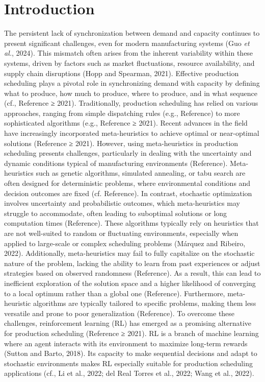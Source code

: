 \section{Introduction}\label{introduction}

The persistent lack of synchronization between demand and capacity
continues to present significant challenges, even for modern
manufacturing systems (Guo \emph{et al.}, 2024). This mismatch often
arises from the inherent variability within these systems, driven by
factors such as market fluctuations, resource availability, and supply
chain disruptions (Hopp and Spearman, 2021). Effective production
scheduling plays a pivotal role in synchronizing demand with capacity by
defining what to produce, how much to produce, where to produce, and in
what sequence (\colorbox{yellow!40}{cf., Reference ≥ 2021}). Traditionally, production
scheduling has relied on various approaches, ranging from simple
dispatching rules (\colorbox{yellow!40}{e.g., Reference}) to more sophisticated
algorithms (\colorbox{yellow!40}{e.g., Reference ≥ 2021}). Recent advances in the field
have increasingly incorporated meta-heuristics to achieve optimal or
near-optimal solutions (\colorbox{yellow!40}{Reference ≥ 2021}). However, using
meta-heuristics in production scheduling presents challenges,
particularly in dealing with the uncertainty and dynamic conditions
typical of manufacturing environments (\colorbox{yellow!40}{Reference}). Meta-heuristics
such as genetic algorithms, simulated annealing, or tabu search are
often designed for deterministic problems, where environmental
conditions and decision outcomes are fixed (\colorbox{yellow!40}{cf. Reference}). In
contrast, stochastic optimization involves uncertainty and probabilistic
outcomes, which meta-heuristics may struggle to accommodate, often
leading to suboptimal solutions or long computation times
(\colorbox{yellow!40}{Reference}). These algorithms typically rely on heuristics that are
not well-suited to random or fluctuating environments, especially when
applied to large-scale or complex scheduling problems (Márquez and
Ribeiro, 2022). Additionally, meta-heuristics may fail to fully
capitalize on the stochastic nature of the problem, lacking the ability
to learn from past experiences or adjust strategies based on observed
randomness (\colorbox{yellow!40}{Reference}). As a result, this can lead to inefficient
exploration of the solution space and a higher likelihood of converging
to a local optimum rather than a global one (\colorbox{yellow!40}{Reference}).
Furthermore, meta-heuristic algorithms are typically tailored to
specific problems, making them less versatile and prone to poor
generalization (\colorbox{yellow!40}{Reference}). To overcome these challenges,
reinforcement learning (RL) has emerged as a promising alternative for
production scheduling (\colorbox{yellow!40}{Reference ≥ 2021}). RL is a branch of machine
learning where an agent interacts with its environment to maximize
long-term rewards (Sutton and Barto, 2018). Its capacity to make
sequential decisions and adapt to stochastic environments makes RL
especially suitable for production scheduling applications (\colorbox{yellow!40}{cf., Li
et al., 2022; del Real Torres et al., 2022; Wang et al., 2022}).

